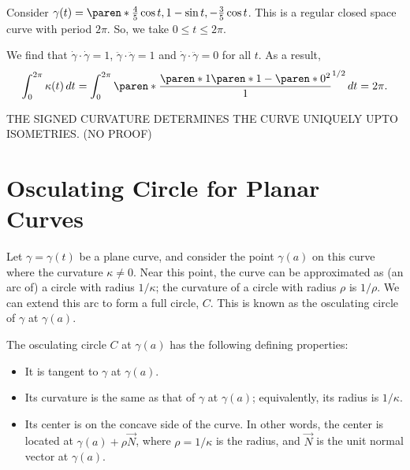 \documentclass[11pt]{penrose}
\newcommand{\vN}{\vec{N}}
\newcommand{\missing}[1]{{\color{red}#1}}
\begin{document}
\begin{negg}
    Consider $\gamma(t) = \paren*{ \frac{4}{5} \cos t, 1 - \sin t, -\frac{3}{5} \cos t }$. This is a regular closed space curve with period $2\pi$. So, we take $0 \leq t \leq 2\pi$.

    We find that $\dot{\gamma}\cdot\dot{\gamma} = 1$, $\ddot{\gamma}\cdot\ddot{\gamma} = 1$ and $\dot{\gamma}\cdot\ddot{\gamma} = 0$ for all $t$. As a result,
    \begin{equation}
        \int_0^{2\pi} \kappa(t) \,dt
        = \int_{0}^{2\pi} \paren*{ \frac{ \paren*{1}\paren*{1} - \paren*{0}^2 }{ 1 } }^{1/2} \,dt
        = 2\pi.
    \end{equation}
\end{negg}

\missing{\begin{nthm}
    THE SIGNED CURVATURE DETERMINES THE CURVE UNIQUELY UPTO ISOMETRIES. (NO PROOF)
\end{nthm}}

\section{Osculating Circle for Planar Curves}
Let $\gamma = \gamma(t)$ be a plane curve, and consider the point $\gamma(a)$ on this curve where the curvature $\kappa \neq 0$. Near this point, the curve can be approximated as (an arc of) a circle with radius $1/\kappa$; the curvature of a circle with radius $\rho$ is $1/\rho$. We can extend this arc to form a full circle, $C$. This is known as the osculating circle of $\gamma$ at $\gamma(a)$.

The osculating circle $C$ at $\gamma(a)$ has the following defining properties:
\begin{itemize}
    \item It is tangent to $\gamma$ at $\gamma(a)$.
    \item Its curvature is the same as that of $\gamma$ at $\gamma(a)$; equivalently, its radius is $1/\kappa$.
    \item Its center is on the concave side of the curve. In other words, the center is located at $\gamma(a) + \rho\vN$, where $\rho = 1/\kappa$ is the radius, and $\vN$ is the unit normal vector at $\gamma(a)$.
\end{itemize}
\end{document}
